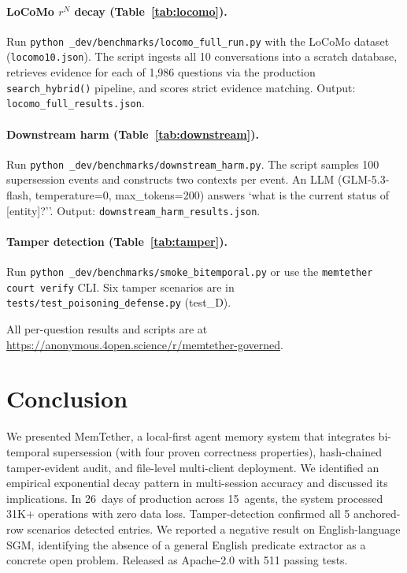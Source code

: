 \documentclass{article}
\begin{document}
\paragraph{LoCoMo $r^N$ decay (Table~\ref{tab:locomo}).}
Run \texttt{python \_dev/benchmarks/locomo\_full\_run.py} with the LoCoMo dataset (\texttt{locomo10.json}).
The script ingests all 10 conversations into a scratch database, retrieves evidence for each of
1{,}986 questions via the production \texttt{search\_hybrid()} pipeline, and scores strict evidence matching.
Output: \texttt{locomo\_full\_results.json}.

\paragraph{Downstream harm (Table~\ref{tab:downstream}).}
Run \texttt{python \_dev/benchmarks/downstream\_harm.py}.
The script samples 100 supersession events and constructs two contexts per event.
An LLM (GLM-5.3-flash, temperature=0, max\_tokens=200) answers `what is the current status of [entity]?''.
Output: \texttt{downstream\_harm\_results.json}.

\paragraph{Tamper detection (Table~\ref{tab:tamper}).}
Run \texttt{python \_dev/benchmarks/smoke\_bitemporal.py} or use the \texttt{memtether court verify} CLI.
Six tamper scenarios are in \texttt{tests/test\_poisoning\_defense.py} (test\_D).

All per-question results and scripts are at \url{https://anonymous.4open.science/r/memtether-governed}.
\section{Conclusion}
We presented MemTether, a local-first agent memory system that integrates bi-temporal supersession (with four proven correctness properties), hash-chained tamper-evident audit, and file-level multi-client deployment. We identified an empirical exponential decay pattern in multi-session accuracy and discussed its implications. In 26~days of production across 15~agents, the system processed 31K+ operations with zero data loss. Tamper-detection confirmed all 5 anchored-row scenarios detected entries. We reported a negative result on English-language SGM, identifying the absence of a general English predicate extractor as a concrete open problem. Released as Apache-2.0 with 511 passing tests.
\end{document}
